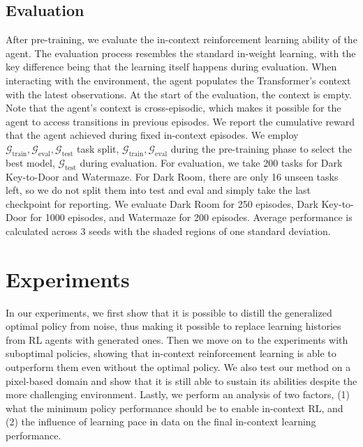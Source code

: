 \documentclass{article}
\theoremstyle{plain}
\theoremstyle{definition}
\theoremstyle{remark}
\begin{document}
\subsection{Evaluation}
After pre-training, we evaluate the in-context reinforcement learning ability of the agent. The evaluation process resembles the standard in-weight learning, with the key difference being that the learning itself happens during evaluation. When interacting with the environment, the agent populates the Transformer's context with the latest observations. At the start of the evaluation, the context is empty. Note that the agent's context is cross-episodic, which makes it possible for the agent to access transitions in previous episodes. We report the cumulative reward that the agent achieved during fixed in-context episodes. We employ $\mathcal{G}_{\textrm{train}}, \mathcal{G}_{\textrm{eval}}, \mathcal{G}_{\textrm{test}}$ task split, $\mathcal{G}_{\textrm{train}}, \mathcal{G}_{\textrm{eval}}$ during the pre-training phase to select the best model, $\mathcal{G}_{\textrm{test}}$ during evaluation. For evaluation, we take 200 tasks for Dark Key-to-Door and Watermaze. For Dark Room, there are only 16 unseen tasks left, so we do not split them into test and eval and simply take the last checkpoint for reporting. We evaluate Dark Room for 250 episodes, Dark Key-to-Door for 1000 episodes, and Watermaze for 200 episodes. Average performance is calculated across 3 seeds with the shaded regions of one standard deviation. 

\section{Experiments}
\label{sec:exp}
In our experiments, we first show that it is possible to distill the generalized optimal policy from noise, thus making it possible to replace learning histories from RL agents with generated ones. Then we move on to the experiments with suboptimal policies, showing that in-context reinforcement learning is able to outperform them even without the optimal policy. We also test our method on a pixel-based domain and show that it is still able to sustain its abilities despite the more challenging environment. Lastly, we perform an analysis of two factors, (1) what the minimum policy performance should be to enable in-context RL, and (2) the influence of learning pace in data on the final in-context learning performance.


\end{document}
